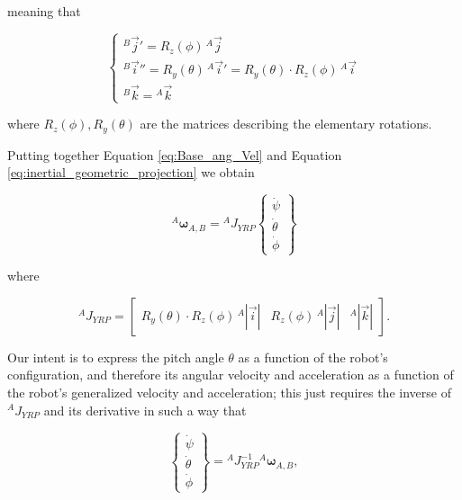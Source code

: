 meaning that 

\begin{equation}
    \begin{cases}
        {}^{B}\vec{j}' = R_z(\phi)\,{}^{A}\vec{j} \\
        {}^{B}\vec{i}'' = R_y(\theta)\,{}^{A}\vec{i}' = R_y(\theta) \cdot R_z(\phi)\,{}^{A}\vec{i} \\
        {}^{B}\vec{k} = {}^{A}\vec{k}
    \end{cases}
    \label{eq:inertial_geometric_projection}
\end{equation}

where $R_z(\phi), R_y(\theta)$ are the matrices describing the elementary rotations.

Putting together Equation \eqref{eq:Base_ang_Vel} and Equation \eqref{eq:inertial_geometric_projection} we obtain

\begin{equation}
    {}^{A} \bm{\omega}_{A,B} = {}^{A}J_{YRP} \begin{Bmatrix}
        \dot{\psi} \\
        \dot{\theta} \\
        \dot{\phi} 
    \end{Bmatrix}
    \label{eq:from YRP vel to base ang vel}
\end{equation}

where 

\begin{equation}
    {}^{A}J_{YRP} = \begin{bmatrix}
        R_y(\theta) \cdot R_z(\phi)\,{}^{A}|\vec{i}| & R_z(\phi)\,{}^{A}|\vec{j}| & {}^{A}|\vec{k}|
    \end{bmatrix}.
    \label{eq:YRP Jacobian}
\end{equation}

Our intent is to express the pitch angle $\theta$ as a function of the robot's configuration, and therefore its angular velocity and acceleration as a function of the robot's generalized velocity and acceleration; this just requires the inverse of ${}^{A}J_{YRP}$ and its derivative in such a way that

\begin{equation}
\begin{Bmatrix}
        \dot{\psi} \\
        \dot{\theta} \\
        \dot{\phi} 
    \end{Bmatrix} = {}^{A}J^{-1}_{YRP} {}^{A} \bm{\omega}_{A,B}
    \label{eq: YRP velocities},
\end{equation}

